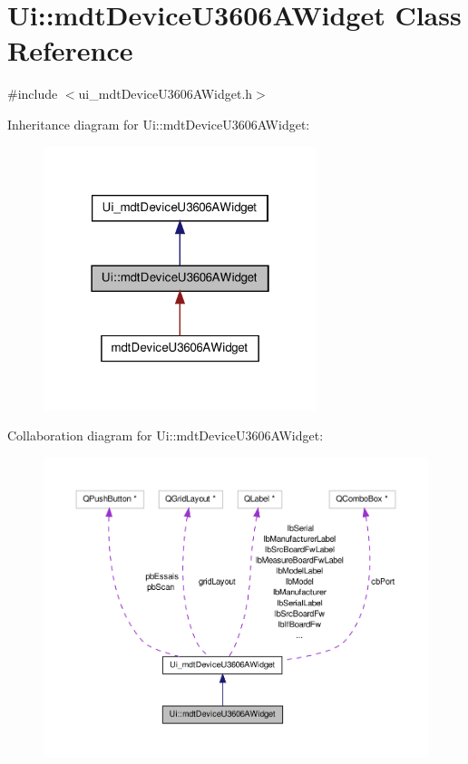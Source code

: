 \hypertarget{class_ui_1_1mdt_device_u3606_a_widget}{\section{Ui\-:\-:mdt\-Device\-U3606\-A\-Widget Class Reference}
\label{class_ui_1_1mdt_device_u3606_a_widget}
}


{\ttfamily \#include $<$ui\-\_\-mdt\-Device\-U3606\-A\-Widget.\-h$>$}



Inheritance diagram for Ui\-:\-:mdt\-Device\-U3606\-A\-Widget\-:\nopagebreak
\begin{figure}[H]
\begin{center}
\leavevmode
\includegraphics[width=226pt]{class_ui_1_1mdt_device_u3606_a_widget__inherit__graph}
\end{center}
\end{figure}


Collaboration diagram for Ui\-:\-:mdt\-Device\-U3606\-A\-Widget\-:\nopagebreak
\begin{figure}[H]
\begin{center}
\leavevmode
\includegraphics[width=350pt]{class_ui_1_1mdt_device_u3606_a_widget__coll__graph}
\end{center}
\end{figure}
